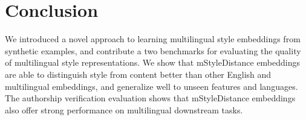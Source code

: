 \section{Conclusion}
\label{sec:conclusion}

We introduced a novel approach to learning multilingual style embeddings from synthetic examples, and contribute a two benchmarks for evaluating the quality of multilingual style representations. We show that {\sc mStyleDistance} embeddings are able to distinguish style from content better than other English and multilingual embeddings, and generalize well to unseen features and languages. The authorship verification evaluation shows that {\sc mStyleDistance} embeddings also offer strong performance on multilingual downstream tasks. %